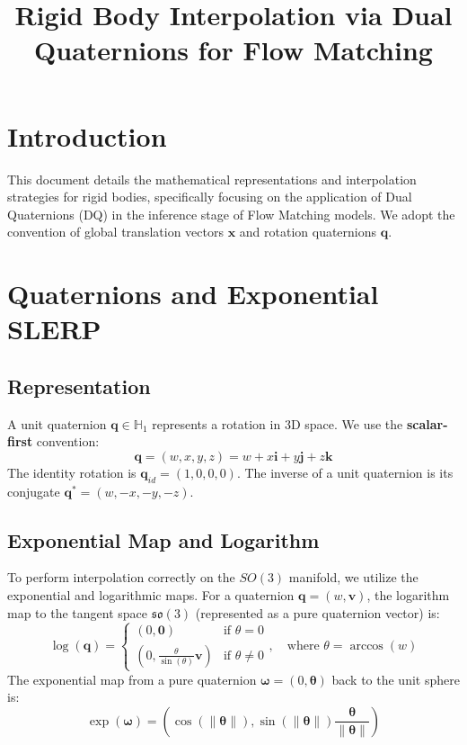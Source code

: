 \documentclass[a4paper,11pt]{article}
\title{Rigid Body Interpolation via Dual Quaternions for Flow Matching}
\author{}
\date{}
\begin{document}
\maketitle

\section{Introduction}
This document details the mathematical representations and interpolation strategies for rigid bodies, specifically focusing on the application of Dual Quaternions (DQ) in the inference stage of Flow Matching models. We adopt the convention of global translation vectors $\bm{x}$ and rotation quaternions $\bm{q}$.

\section{\texorpdfstring{Quaternions and Exponential SLERP}{Quaternions and Exponential SLERP}}

\subsection{Representation}
A unit quaternion $\bm{q} \in \mathbb{H}_1$ represents a rotation in 3D space. We use the \textbf{scalar-first} convention:
\begin{equation}
    \bm{q} = (w, x, y, z) = w + x\mathbf{i} + y\mathbf{j} + z\mathbf{k}
\end{equation}
The identity rotation is $\bm{q}_{id} = (1, 0, 0, 0)$. The inverse of a unit quaternion is its conjugate $\bm{q}^* = (w, -x, -y, -z)$.

\subsection{Exponential Map and Logarithm}
To perform interpolation correctly on the $SO(3)$ manifold, we utilize the exponential and logarithmic maps. For a quaternion $\bm{q} = (w, \bm{v})$, the logarithm map to the tangent space $\mathfrak{so}(3)$ (represented as a pure quaternion vector) is:
\begin{equation}
    \log(\bm{q}) = \begin{cases} 
        (0, \mathbf{0}) & \text{if } \theta = 0 \\
        \left(0, \frac{\theta}{\sin(\theta)}\bm{v} \right) & \text{if } \theta \neq 0 
    \end{cases}, \quad \text{where } \theta = \arccos(w)
\end{equation}
The exponential map from a pure quaternion $\bm{\omega} = (0, \bm{\theta})$ back to the unit sphere is:
\begin{equation}
    \exp(\bm{\omega}) = \left( \cos(\|\bm{\theta}\|), \sin(\|\bm{\theta}\|) \frac{\bm{\theta}}{\|\bm{\theta}\|} \right)
\end{equation}
\end{document}
